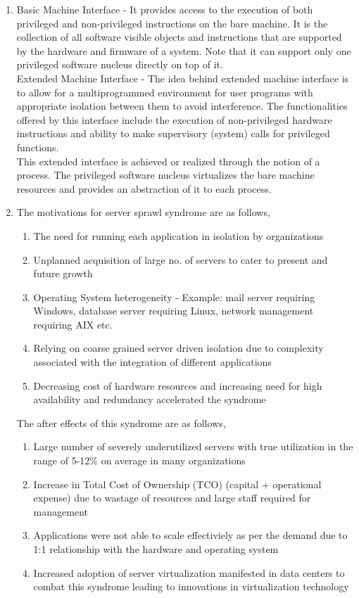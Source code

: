\documentclass[11pt,a4paper,oneside]{article}
\begin{document}
\begin{enumerate}
		\item Basic Machine Interface - It provides access to the execution of both privileged and non-privileged instructions on the bare machine. It is the collection of all software visible objects and instructions that are supported by the hardware and firmware of a system. Note that it can support only one privileged software nucleus directly on top of it.\\
		
		      Extended Machine Interface - The idea behind extended machine interface is to allow for a multiprogrammed environment for user programs with appropriate isolation between them to avoid interference.  The functionalities offered by this interface include the execution of non-privileged hardware instructions and ability to make supervisory (system) calls for privileged functions. \\
		      
		      This extended interface is achieved or realized through the notion of a process. The privileged software nucleus virtualizes the bare machine resources and provides an abstraction of it to each process.
				  
		\item The motivations for server sprawl syndrome are as follows,
		     \begin{enumerate}
		     	\item The need for running each application in isolation by organizations	
		     	\item Unplanned acquisition of large no. of servers to cater to present and future growth
		     	\item Operating System heterogeneity - Example: mail server requiring Windows, database server requiring Linux, network management requiring AIX etc.
		     	\item Relying on coarse grained server driven isolation due to complexity associated with the integration of different applications 
		     	\item Decreasing cost of hardware resources and increasing need for high availability and redundancy accelerated the syndrome  	
		     \end{enumerate}
	          The after effects of this syndrome are as follows,
	          \begin{enumerate}
	          	\item Large number of severely underutilized servers with true utilization in the range of 5-12\% on average in many organizations
	          	\item Increase in Total Cost of Ownership (TCO) (capital + operational expense) due to wastage of resources and large staff required for management
	          	\item Applications were not able to scale effectiviely as per the demand due to 1:1 relationship with the hardware and operating system
	          	\item Increased adoption of server virtualization manifested in data centers to combat this syndrome leading to innovations in virtualization technology   	
	          \end{enumerate}
          

\end{enumerate}
\end{document}
